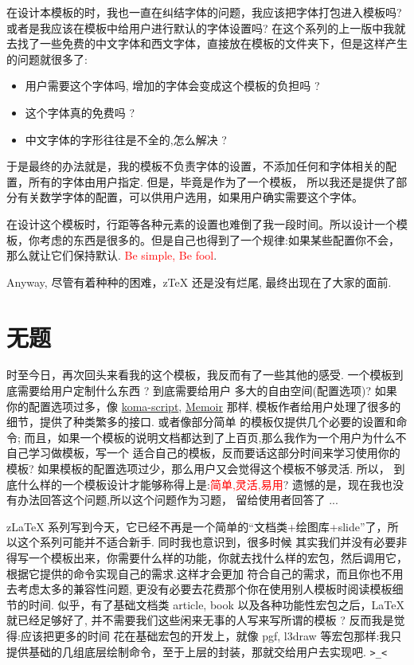 \documentclass[
  hyper,    
  lang=cn,
  class=book,
  mathSpec={envStyle=leftbar, alias},
  toc={redef}
]{zlatex}
\begin{document}
在设计本模板的时，我也一直在纠结字体的问题，我应该把字体打包进入模板吗? 或者是我应该在模板中给用户进行默认的字体设置吗?
在这个系列的上一版中我就去找了一些免费的中文字体和西文字体，直接放在模板的文件夹下，但是这样产生的问题就很多了:

\begin{itemize}
    \item 用户需要这个字体吗, 增加的字体会变成这个模板的负担吗 ?
    \item 这个字体真的免费吗 ?
    \item 中文字体的字形往往是不全的,怎么解决 ? 
\end{itemize}

于是最终的办法就是，我的模板不负责字体的设置，不添加任何和字体相关的配置，所有的字体由用户指定. 但是，毕竟是作为了一个模板，
所以我还是提供了部分有关数学字体的配置，可以供用户选用，如果用户确实需要这个字体。

在设计这个模板时，行距等各种元素的设置也难倒了我一段时间。所以设计一个模板，你考虑的东西是很多的。但是自己也得到了一个规律:如果某些配置你不会，
那么就让它们保持默认. \textcolor{red}{Be simple, Be fool}.

Anyway, 尽管有着种种的困难，z\TeX{} 还是没有烂尾, 最终出现在了大家的面前. 

\section{无题}
时至今日，再次回头来看我的这个模板，我反而有了一些其他的感受. 一个模板到底需要给用户定制什么东西 ? 到底需要给用户
多大的自由空间(配置选项)? 如果你的配置选项过多，像 \href{https://www.ctan.org/pkg/koma-script}{koma-script}, 
\href{https://ctan.org/pkg/memoir}{Memoir} 那样, 模板作者给用户处理了很多的细节，提供了种类繁多的接口. 或者像部分简单
的模板仅提供几个必要的设置和命令; 而且，如果一个模板的说明文档都达到了上百页,那么我作为一个用户为什么不自己学习做模板，写一个
适合自己的模板，反而要话这部分时间来学习使用你的模板? 如果模板的配置选项过少，那么用户又会觉得这个模板不够灵活. 所以，
到底什么样的一个模板设计才能够称得上是:\textcolor{red}{简单,灵活,易用}? 遗憾的是，现在我也没有办法回答这个问题,所以这个问题作为习题，
留给使用者回答了 ...

z\LaTeX{} 系列写到今天，它已经不再是一个简单的``文档类+绘图库+slide''了，所以这个系列可能并不适合新手. 同时我也意识到，很多时候
其实我们并没有必要非得写一个模板出来，你需要什么样的功能，你就去找什么样的宏包，然后调用它，根据它提供的命令实现自己的需求.这样才会更加
符合自己的需求，而且你也不用去考虑太多的兼容性问题, 更没有必要去花费那个你在使用别人模板时阅读模板细节的时间. 似乎，有了基础文档类 
article, book 以及各种功能性宏包之后，\LaTeX{}就已经足够好了, 并不需要我们这些闲来无事的人写来写所谓的模板 ? 反而我是觉得:应该把更多的时间
花在基础宏包的开发上，就像 pgf, l3draw 等宏包那样:我只提供基础的几组底层绘制命令，至于上层的封装，那就交给用户去实现吧. \texttt{>\_<}
\end{document}
